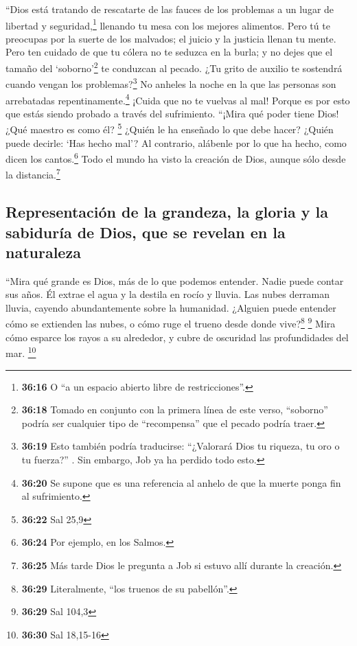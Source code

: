  ``Dios está tratando de rescatarte de las fauces de los
problemas a un lugar de libertad y seguridad,\footnote{\textbf{36:16} O
  ``a un espacio abierto libre de restricciones''.} llenando tu mesa con
los mejores alimentos.  Pero tú te preocupas por la
suerte de los malvados; el juicio y la justicia llenan tu mente.
 Pero ten cuidado de que tu cólera no te seduzca en la
burla; y no dejes que el tamaño del `soborno'\footnote{\textbf{36:18}
  Tomado en conjunto con la primera línea de este verso, ``soborno''
  podría ser cualquier tipo de ``recompensa'' que el pecado podría
  traer.} te conduzcan al pecado.  ¿Tu grito de auxilio
te sostendrá cuando vengan los problemas?\footnote{\textbf{36:19} Esto
  también podría traducirse: ``¿Valorará Dios tu riqueza, tu oro o tu
  fuerza?'' . Sin embargo, Job ya ha perdido todo esto.} 
No anheles la noche en la que las personas son arrebatadas
repentinamente.\footnote{\textbf{36:20} Se supone que es una referencia
  al anhelo de que la muerte ponga fin al sufrimiento.} 
¡Cuida que no te vuelvas al mal! Porque es por esto que estás siendo
probado a través del sufrimiento.  ``¡Mira qué poder
tiene Dios! ¿Qué maestro es como él? \footnote{\textbf{36:22} Sal 25,9}
 ¿Quién le ha enseñado lo que debe hacer? ¿Quién puede
decirle: `Has hecho mal'?  Al contrario, alábenle por lo
que ha hecho, como dicen los cantos.\footnote{\textbf{36:24} Por
  ejemplo, en los Salmos.}  Todo el mundo ha visto la
creación de Dios, aunque sólo desde la distancia.\footnote{\textbf{36:25}
  Más tarde Dios le pregunta a Job si estuvo allí durante la creación.}

\hypertarget{representaciuxf3n-de-la-grandeza-la-gloria-y-la-sabiduruxeda-de-dios-que-se-revelan-en-la-naturaleza}{%
\subsection{Representación de la grandeza, la gloria y la sabiduría de
Dios, que se revelan en la
naturaleza}\label{representaciuxf3n-de-la-grandeza-la-gloria-y-la-sabiduruxeda-de-dios-que-se-revelan-en-la-naturaleza}}

 ``Mira qué grande es Dios, más de lo que podemos
entender. Nadie puede contar sus años.  Él extrae el agua
y la destila en rocío y lluvia.  Las nubes derraman
lluvia, cayendo abundantemente sobre la humanidad. 
¿Alguien puede entender cómo se extienden las nubes, o cómo ruge el
trueno desde donde vive?\footnote{\textbf{36:29} Literalmente, ``los
  truenos de su pabellón''.} \footnote{\textbf{36:29} Sal 104,3}
 Mira cómo esparce los rayos a su alrededor, y cubre de
oscuridad las profundidades del mar. \footnote{\textbf{36:30} Sal
  18,15-16}

